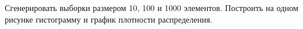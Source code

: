 \item Сгенерировать выборки размером 10, 100 и 1000 элементов.
Построить на одном рисунке гистограмму и график плотности распределения.